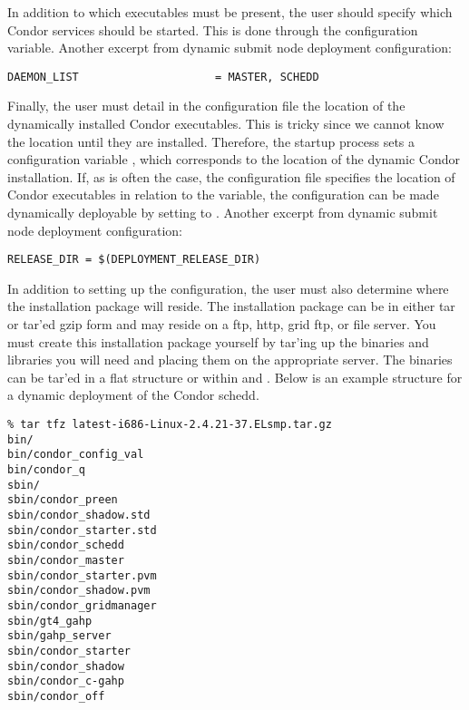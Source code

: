 In addition to which executables must be present, the user should
specify which Condor services should be started.  This is done through
the  configuration variable.  Another excerpt
from dynamic submit node deployment configuration:

\footnotesize
\begin{verbatim}
DAEMON_LIST                     = MASTER, SCHEDD
\end{verbatim}
\normalsize

Finally, the user must detail in the configuration file the location
of the dynamically installed Condor executables.  This is tricky since
we cannot know the location until they are installed.  Therefore, the
startup process sets a configuration variable
, which corresponds to the location of
the dynamic Condor installation.  If, as is often the case, the
configuration file specifies the location of Condor executables in
relation to the  variable, the configuration can
be made dynamically deployable by setting  to
.  Another excerpt from dynamic
submit node deployment configuration:

\footnotesize
\begin{verbatim}
RELEASE_DIR = $(DEPLOYMENT_RELEASE_DIR)
\end{verbatim}
\normalsize

In addition to setting up the configuration, the user must also
determine where the installation package will reside.  The
installation package can be in either tar or tar'ed gzip form and may
reside on a ftp, http, grid ftp, or file server.  You must create this
installation package yourself by tar'ing up the binaries and libraries
you will need and placing them on the appropriate server.  The
binaries can be tar'ed in a flat structure or within  and
.  Below is an example structure for a dynamic deployment
of the Condor schedd.

\footnotesize
\begin{verbatim}
% tar tfz latest-i686-Linux-2.4.21-37.ELsmp.tar.gz
bin/
bin/condor_config_val
bin/condor_q
sbin/
sbin/condor_preen
sbin/condor_shadow.std
sbin/condor_starter.std
sbin/condor_schedd
sbin/condor_master
sbin/condor_starter.pvm
sbin/condor_shadow.pvm
sbin/condor_gridmanager
sbin/gt4_gahp
sbin/gahp_server
sbin/condor_starter
sbin/condor_shadow
sbin/condor_c-gahp
sbin/condor_off 
\end{verbatim}
\normalsize
